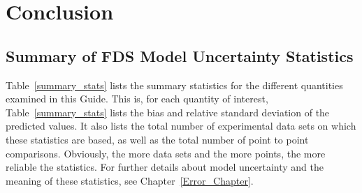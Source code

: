\documentclass[11pt]{book}
\begin{document}
\mainmatter
































\chapter{Conclusion}


\section{Summary of FDS Model Uncertainty Statistics}
\label{normality_tests}

Table~\ref{summary_stats} lists the summary statistics for the different quantities examined in this Guide. This is, for each quantity of interest, Table~\ref{summary_stats} lists the bias and relative standard deviation of the predicted values. It also lists the total number of experimental data sets on which these statistics are based, as well as the total number of point to point comparisons. Obviously, the more data sets and the more points, the more reliable the statistics. For further details about model uncertainty and the meaning of these statistics, see Chapter~\ref{Error_Chapter}.

\end{document}
